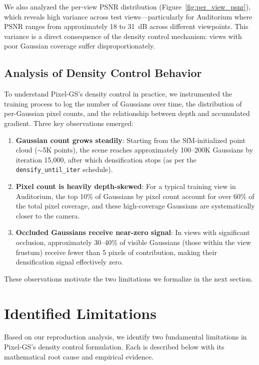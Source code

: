 \documentclass[conference]{IEEEtran}
\begin{document}
We also analyzed the per-view PSNR distribution (Figure~\ref{fig:per_view_psnr}), which reveals high variance across test views—particularly for Auditorium where PSNR ranges from approximately 18 to 31~dB across different viewpoints. This variance is a direct consequence of the density control mechanism: views with poor Gaussian coverage suffer disproportionately.

\subsection{Analysis of Density Control Behavior}

To understand Pixel-GS's density control in practice, we instrumented the training process to log the number of Gaussians over time, the distribution of per-Gaussian pixel counts, and the relationship between depth and accumulated gradient. Three key observations emerged:

\begin{enumerate}
    \item \textbf{Gaussian count grows steadily}: Starting from the SfM-initialized point cloud ($\sim$5K points), the scene reaches approximately 100--200K Gaussians by iteration 15,000, after which densification stops (as per the \texttt{densify\_until\_iter} schedule).

    \item \textbf{Pixel count is heavily depth-skewed}: For a typical training view in Auditorium, the top 10\% of Gaussians by pixel count account for over 60\% of the total pixel coverage, and these high-coverage Gaussians are systematically closer to the camera.

    \item \textbf{Occluded Gaussians receive near-zero signal}: In views with significant occlusion, approximately 30--40\% of visible Gaussians (those within the view frustum) receive fewer than 5 pixels of contribution, making their densification signal effectively zero.
\end{enumerate}

These observations motivate the two limitations we formalize in the next section.

\section{Identified Limitations}

Based on our reproduction analysis, we identify two fundamental limitations in Pixel-GS's density control formulation. Each is described below with its mathematical root cause and empirical evidence.
\end{document}
